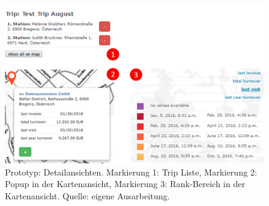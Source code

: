 \documentclass[Bachelorarbeit.tex]{subfiles}
\begin{document}
\begin{figure}[h]
\centering
\includegraphics[width=1\linewidth]{img/Prototyp/Details}
\caption[Prototyp: Detailansichten]{Prototyp: Detailansichten. Markierung 1: Trip Liste, Markierung 2: Popup in der Kartenansicht, Markierung 3: Rank-Bereich in der Kartenansicht. Quelle: eigene Ausarbeitung.}
\label{fig:Details}
\end{figure}
\end{document}

